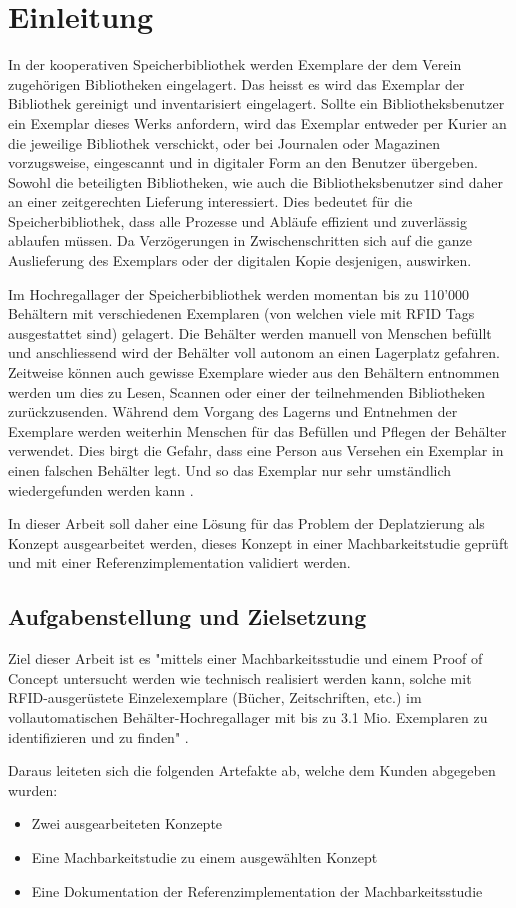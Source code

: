 \chapter{Einleitung}
In der kooperativen Speicherbibliothek werden Exemplare der dem Verein zugehörigen Bibliotheken eingelagert. Das heisst es wird das Exemplar der Bibliothek gereinigt und inventarisiert eingelagert. Sollte ein Bibliotheksbenutzer ein Exemplar dieses Werks anfordern, wird das Exemplar entweder per Kurier an die jeweilige Bibliothek verschickt, oder bei Journalen oder Magazinen vorzugsweise, eingescannt und in digitaler Form an den Benutzer übergeben. Sowohl die beteiligten Bibliotheken, wie auch die Bibliotheksbenutzer sind daher an einer zeitgerechten Lieferung interessiert. Dies bedeutet für die Speicherbibliothek, dass alle Prozesse und Abläufe effizient und zuverlässig ablaufen müssen. Da Verzögerungen in Zwischenschritten sich auf die ganze Auslieferung des Exemplars oder der digitalen Kopie desjenigen, auswirken.

Im Hochregallager der Speicherbibliothek werden momentan bis zu 110'000 Behältern mit verschiedenen Exemplaren (von welchen viele mit RFID Tags ausgestattet sind) gelagert. Die Behälter werden manuell von Menschen befüllt und anschliessend wird der Behälter voll autonom an einen Lagerplatz gefahren. Zeitweise können auch gewisse Exemplare wieder aus den Behältern entnommen werden um dies zu Lesen, Scannen oder einer der teilnehmenden Bibliotheken zurückzusenden. Während dem Vorgang des Lagerns und Entnehmen der Exemplare werden weiterhin Menschen für das Befüllen und Pflegen der Behälter verwendet. Dies birgt die Gefahr, dass eine Person aus Versehen ein Exemplar in einen falschen Behälter legt. Und so das Exemplar nur sehr umständlich wiedergefunden werden kann \parencite{WickiBaumann2019Projektbeschrieb}.

In dieser Arbeit soll daher eine Lösung für das Problem der Deplatzierung als Konzept ausgearbeitet werden, dieses Konzept in einer Machbarkeitstudie geprüft und mit einer Referenzimplementation validiert werden.

\section{Aufgabenstellung und Zielsetzung}
Ziel dieser Arbeit ist es "mittels einer Machbarkeitsstudie und einem Proof of Concept untersucht werden wie technisch realisiert werden kann, solche mit RFID-ausgerüstete Einzelexemplare (Bücher, Zeitschriften, etc.) im vollautomatischen Behälter-Hochregallager mit bis zu 3.1 Mio. Exemplaren zu identifizieren und zu finden" \parencite{WickiBaumann2019Projektbeschrieb}.

Daraus leiteten sich die folgenden Artefakte ab, welche dem Kunden abgegeben wurden:
\begin{itemize}
	\item Zwei ausgearbeiteten Konzepte
	\item Eine Machbarkeitstudie zu einem ausgewählten Konzept
	\item Eine Dokumentation der Referenzimplementation der Machbarkeitsstudie
\end{itemize}

